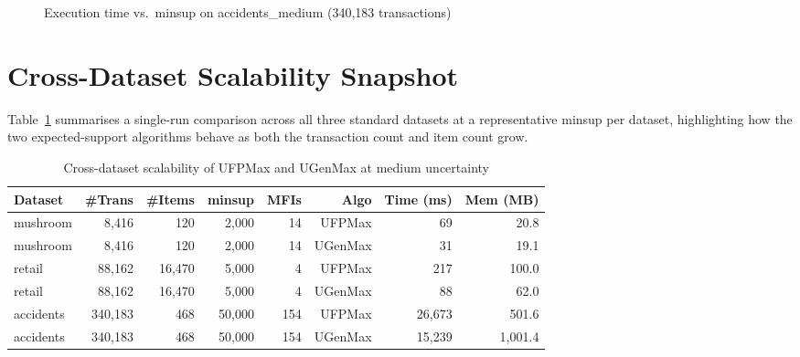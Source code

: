 \documentclass[12pt,a4paper]{report}
\begin{document}
  \begin{figure}[h]
    \centering
    \caption{Execution time vs.\ minsup on accidents\_medium (340,183 transactions)}
    \label{fig:accidents_time}
  \end{figure}

  \section{Cross-Dataset Scalability Snapshot}

  Table~\ref{tab:scalability} summarises a single-run comparison across all three standard datasets at a representative minsup per dataset, highlighting how the two expected-support algorithms behave as both the transaction count and item count grow.

  \begin{table}[h]
    \centering
    \caption{Cross-dataset scalability of UFPMax and UGenMax at medium uncertainty}
    \label{tab:scalability}
    \begin{tabular}{lrrrrrrr}
      \toprule
      \textbf{Dataset} & \textbf{\#Trans} & \textbf{\#Items} & \textbf{minsup} & \textbf{MFIs} & \textbf{Algo} & \textbf{Time (ms)} & \textbf{Mem (MB)} \\
      \midrule
      mushroom & 8,416 & 120 & 2,000 & 14 & UFPMax & 69 & 20.8 \\
      mushroom & 8,416 & 120 & 2,000 & 14 & UGenMax & 31 & 19.1 \\
      retail & 88,162 & 16,470 & 5,000 & 4 & UFPMax & 217 & 100.0 \\
      retail & 88,162 & 16,470 & 5,000 & 4 & UGenMax & 88 & 62.0 \\
      accidents & 340,183 & 468 & 50,000 & 154 & UFPMax & 26,673 & 501.6 \\
      accidents & 340,183 & 468 & 50,000 & 154 & UGenMax & 15,239 & 1,001.4 \\
      \bottomrule
    \end{tabular}
  \end{table}
\end{document}
